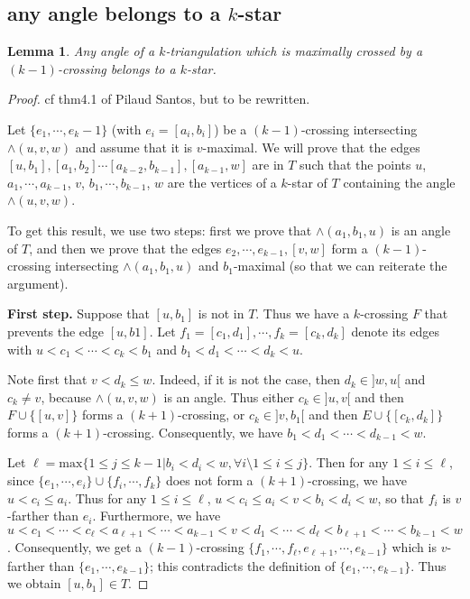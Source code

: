 \documentclass{amsart}
\newtheorem{lemma}[theorem]{Lemma}
\theoremstyle{remark}
\newcommand*{\ktg}[0]{$k$-triangulation\xspace}
\begin{document}
\subsection{any angle belongs to a $k$-star}

\begin{lemma}
Any angle of a \ktg which is maximally crossed by a $(k-1)$-crossing belongs to a $k$-star.
\end{lemma}
\begin{proof}
cf thm4.1 of  Pilaud Santos, but to be rewritten.



Let $\{e_1, \cdots , e{_k-1}\}$ (with $e_i = [a_i, b_i]$) be a $(k - 1)$-crossing intersecting $\wedge(u, v, w)$ and assume that it is $v$-maximal. 
We will prove that the edges $[u, b_1],[a_1, b_2]\cdots[a_{k-2}, b_{k-1}], [a_{k-1}, w]$ are in $T$ such that the points $u$, $a_1,\cdots,a_{k-1}$, $v$, $b_1,\cdots,b_{k-1}$, $w$ are the vertices of a $k$-star of $T$ containing the angle $\wedge(u, v, w)$. 

To get this result, we use two steps: first we prove that $\wedge(a_1, b_1, u)$ is an angle of $T$, and then we prove that the edges $e_2,\cdots, e_{k-1}, [v, w]$ form a $(k-1)$-crossing intersecting $\wedge(a_1, b_1, u)$ and $b_1$-maximal (so that we can reiterate the argument).

{\bf First step.}
Suppose that $[u, b_1]$ is not in $T$. 
Thus we have a $k$-crossing $F$ that prevents the edge $[u, b1]$.
Let $f_1 = [c_1, d_1],\cdots, f_k = [c_k, d_k]$ denote its
edges with $u < c_1 < \cdots < c_k < b_1$ and $b_1 < d_1 < \cdots < d_k < u$.

Note first that $v < d_k \leq w$. Indeed, if it is not the case, then
$d_k \in ]w, u[$ and $c_k \neq v$, because $\wedge(u, v, w)$ is an angle. 
Thus either $c_k \in ]u, v[$ and then $F \cup \{[u, v]\}$ forms a $(k + 1)$-crossing, 
or $c_k \in ]v, b_1[$ and then $E \cup \{[c_k, d_k]\}$ forms a $(k + 1)$-crossing. 
Consequently, we have $b_1 < d_1 < \cdots < d_{k-1} < w$.

Let $\ell = \text{max}\{1 \leq j \leq k - 1 | b_i < d_i < w, \forall i \setminus 1 \leq i \leq j\}$.
Then for any $1 \leq i \leq \ell$, since $\{e_1, \cdots , e_i\} \cup \{f_i, \cdots , f_k\}$ does not form
a $(k + 1)$-crossing, we have $u < c_i \leq a_i$. Thus for any $1 \leq i \leq \ell$, $u < c_i \leq a_i < v < b_i < d_i < w$, so that $f_i$
is $v$-farther than $e_i$.
Furthermore, we have $u < c_1 < \cdots < c_\ell < a_{\ell+1} < \cdots < a_{k-1} < v < d_1 < \cdots < d_\ell < b_{\ell+1} < \cdots < b_{k-1} < w$. 
Consequently, we get a $(k - 1)$-crossing $\{f_1, \cdots , f_\ell
, e_{\ell+1}, \cdots , e_{k-1}\}$ which is $v$-farther than $\{e_1, \cdots , e_{k-1}\}$; this contradicts the definition of $\{e_1, \cdots , e_{k-1}\}$. 
Thus we obtain $[u, b_1] \in  T$.


\end{proof}
\end{document}
